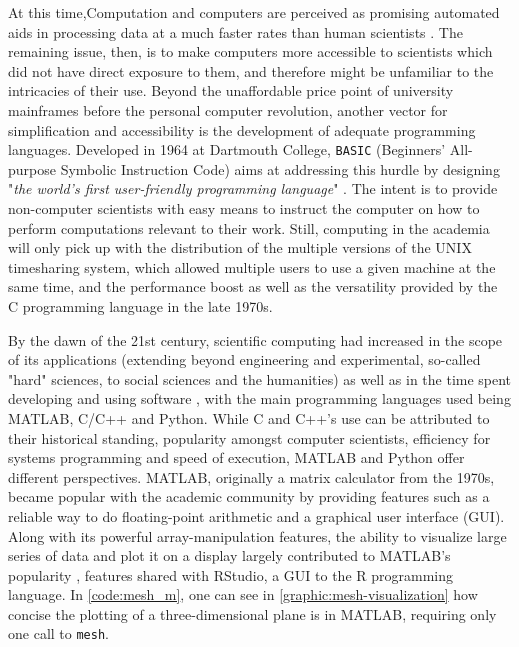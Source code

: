 At this time,Computation and computers are perceived as promising automated aids in processing data at a much faster rates than human scientists \citep{licklider_mancomputer_1960}. The remaining issue, then, is to make computers more accessible to scientists which did not have direct exposure to them, and therefore might be unfamiliar to the intricacies of their use. Beyond the unaffordable price point of university mainframes before the personal computer revolution, another vector for simplification and accessibility is the development of adequate programming languages. Developed in 1964 at Dartmouth College, \lstinline{BASIC} (Beginners' All-purpose Symbolic Instruction Code) aims at addressing this hurdle by designing "\emph{the world's first user-friendly programming language}" \citep{brooks_finally_2019}. The intent is to provide non-computer scientists with easy means to instruct the computer on how to perform computations relevant to their work. Still, computing in the academia will only pick up with the distribution of the multiple versions of the UNIX timesharing system, which allowed multiple users to use a given machine at the same time, and the performance boost as well as the versatility provided by the C programming language in the late 1970s.

By the dawn of the 21st century, scientific computing had increased in the scope of its applications (extending beyond engineering and experimental, so-called "hard" sciences, to social sciences and the humanities) as well as in the time spent developing and using software \citep{prabhu_survey_2011} \citep{hannay_how_2009}, with the main programming languages used being MATLAB, C/C++ and Python. While C and C++'s use can be attributed to their historical standing, popularity amongst computer scientists, efficiency for systems programming and speed of execution, MATLAB and Python offer different perspectives. MATLAB, originally a matrix calculator from the 1970s, became popular with the academic community by providing features such as a reliable way to do floating-point arithmetic and a graphical user interface (GUI). Along with its powerful array-manipulation features, the ability to visualize large series of data and plot it on a display largely contributed to MATLAB's popularity \citep{moler_history_2020}, features shared with RStudio, a GUI to the R programming language. In \ref{code:mesh_m}, one can see in \ref{graphic:mesh-visualization} how concise the plotting of a three-dimensional plane is in MATLAB, requiring only one call to \lstinline{mesh}.

